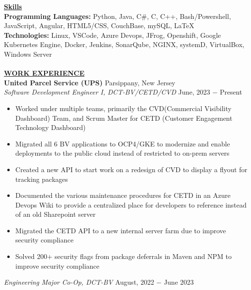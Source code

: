\documentclass{article}
\begin{document}
\noindent \textbf{\underline{Skills}} \\
\noindent \textbf{Programming Languages: } Python, Java, C\#, C, C++, Bash/Powershell, JavaScript, Angular, HTML5/CSS, CouchBase, mySQL, \LaTeX\\
\noindent \textbf{Technologies: } Linux, VSCode, Azure Devops, JFrog, Openshift, Google Kubernetes Engine, Docker, Jenkins, SonarQube, NGINX, systemD, VirtualBox, Windows Server\\ \\
% 
%
\noindent \textbf{\underline{WORK EXPERIENCE}} \\
\noindent \textbf{United Parcel Service (UPS)} \hfill Parsippany, New Jersey \\
\textit{Software Development Engineer I, DCT-BV/CETD/CVD} \hfill June, 2023 $-$ Present
\begin{itemize}[noitemsep,nolistsep,leftmargin=*]
\item {Worked under multiple teams, primarily the CVD(Commercial Visibility Dashboard) Team, and Scrum Master for CETD (Customer Engagement Technology Dashboard)}
\item {Migrated all 6 BV applications to OCP4/GKE to modernize and enable deployments to the public cloud instead of restricted to on-prem servers}
\item {Created a new API to start work on a redesign of CVD to display a flyout for tracking packages}
\item {Documented the various maintenance procedures for CETD in an Azure Devops Wiki to provide a centralized place for developers to reference instead of an old Sharepoint server}
\item {Migrated the CETD API to a new internal server farm due to improve security compliance}
\item {Solved 200+ security flags from package deferrals in Maven and NPM to improve security compliance}
\end{itemize}\textit{Engineering Major Co-Op, DCT-BV} \hfill August, 2022 $-$ June 2023
\end{document}
